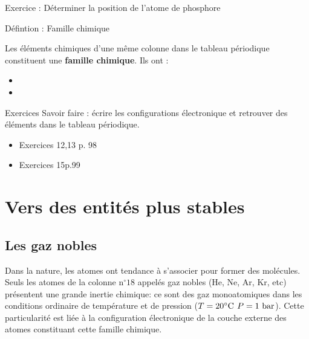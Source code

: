 \documentclass[french]{article}
\begin{document}
\begin{Exercice}{Exercice : Déterminer la position de l'atome de phosphore}

	\medskip 

	\dotfill \medskip

	\dotfill \medskip

	\dotfill
\end{Exercice}


\begin{definition}{Défintion : Famille chimique}

Les éléments chimiques d'une même colonne dans le tableau périodique constituent une \textbf{famille chimique}.  Ils ont :

\begin{itemize}
	\item \dotfill \bigskip
	
	\item \dotfill 
\end{itemize}

\end{definition}

\begin{Exercice}{Exercices}
	Savoir faire : écrire les configurations électronique et retrouver des éléments dans le tableau périodique.

	\begin{itemize}
		\item Exercices 12,13 p. 98
		\item Exercices 15p.99
	\end{itemize}
\end{Exercice}
\section{Vers des entités plus stables}

\subsection{Les gaz nobles}
Dans la nature, les atomes ont tendance à s'associer pour former des molécules. Seuls les atomes de la colonne n$^\circ 18$ appelés gaz nobles (He, Ne, Ar, Kr, etc) présentent une grande inertie chimique: ce sont des gaz monoatomiques dans les conditions ordinaire de température et de pression ($T=20^\circ \rm C$ $P = 1~\rm  bar$).  Cette particularité est liée à la configuration électronique de la couche externe des atomes constituant cette famille chimique. 
\end{document}
